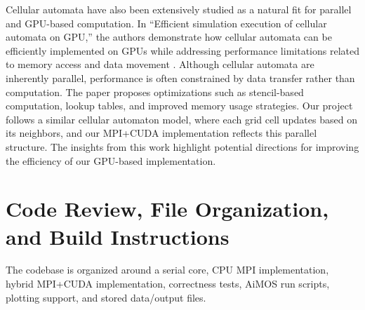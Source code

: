 \documentclass[10pt,twocolumn]{article}
\begin{document}
Cellular automata have also been extensively studied as a natural fit for parallel and GPU-based computation. In ``Efficient simulation execution of cellular automata on GPU,'' the authors demonstrate how cellular automata can be efficiently implemented on GPUs while addressing performance limitations related to memory access and data movement \cite{automata}. Although cellular automata are inherently parallel, performance is often constrained by data transfer rather than computation. The paper proposes optimizations such as stencil-based computation, lookup tables, and improved memory usage strategies. Our project follows a similar cellular automaton model, where each grid cell updates based on its neighbors, and our MPI+CUDA implementation reflects this parallel structure. The insights from this work highlight potential directions for improving the efficiency of our GPU-based implementation.   

\section*{Code Review, File Organization, and Build Instructions}

The codebase is organized around a serial core, CPU MPI implementation, hybrid MPI+CUDA implementation, correctness tests, AiMOS run scripts, plotting support, and stored data/output files.
\end{document}

